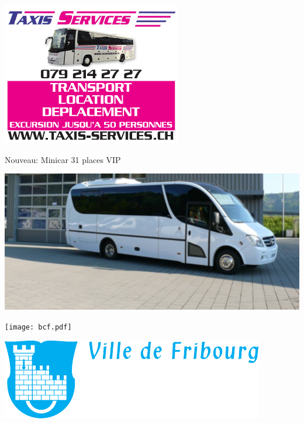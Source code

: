 {\centering
\includegraphics[width=.95\textwidth]{taxi.pdf}
\par
\vspace*{20mm}

{\Huge
Nouveau: Minicar 31 places VIP}
\par
\includegraphics[width=.8\textwidth]{bus.png}
\par
}
\clearpage
\thispagestyle{empty}%
{\centering
\texttt{[image: bcf.pdf]}
\par
\vspace*{20mm}
\vfill
\includegraphics[width=.8\textwidth]{ville.pdf}
\vfill
\par
}
